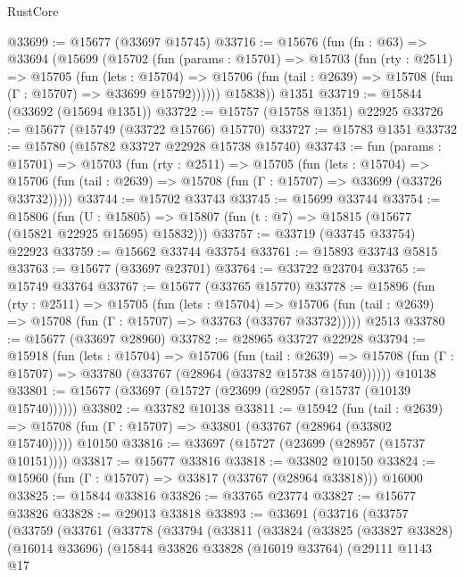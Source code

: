 \begin{lexlean}{RustCore}
\begin{coremodule}
@33699 := @15677 (@33697 @15745)
@33716 := @15676
    (fun (fn : @63) =>
    @33694
      (@15699
        (@15702
          (fun (params : @15701) =>
          @15703
            (fun (rty : @2511) =>
            @15705
              (fun (lets : @15704) =>
              @15706 (fun (tail : @2639) => @15708 (fun (Γ : @15707) => @33699 @15792))))))
        @15838))
    @1351
@33719 := @15844 (@33692 (@15694 @1351))
@33722 := @15757 (@15758 @1351) @22925
@33726 := @15677 (@15749 (@33722 @15766) @15770)
@33727 := @15783 @1351
@33732 := @15780 (@15782 @33727 @22928 @15738 @15740)
@33743 := fun (params : @15701) =>
  @15703
    (fun (rty : @2511) =>
    @15705
      (fun (lets : @15704) =>
      @15706 (fun (tail : @2639) => @15708 (fun (Γ : @15707) => @33699 (@33726 @33732)))))
@33744 := @15702 @33743
@33745 := @15699 @33744
@33754 := @15806
    (fun (U : @15805) => @15807 (fun (t : @7) => @15815 (@15677 (@15821 @22925 @15695) @15832)))
@33757 := @33719 (@33745 @33754) @22923
@33759 := @15662 @33744 @33754
@33761 := @15893 @33743 @5815
@33763 := @15677 (@33697 @23701)
@33764 := @33722 @23704
@33765 := @15749 @33764
@33767 := @15677 (@33765 @15770)
@33778 := @15896
    (fun (rty : @2511) =>
    @15705
      (fun (lets : @15704) =>
      @15706 (fun (tail : @2639) => @15708 (fun (Γ : @15707) => @33763 (@33767 @33732)))))
    @2513
@33780 := @15677 (@33697 @28960)
@33782 := @28965 @33727 @22928
@33794 := @15918
    (fun (lets : @15704) =>
    @15706
      (fun (tail : @2639) =>
      @15708 (fun (Γ : @15707) => @33780 (@33767 (@28964 (@33782 @15738 @15740))))))
    @10138
@33801 := @15677 (@33697 (@15727 (@23699 (@28957 (@15737 (@10139 @15740))))))
@33802 := @33782 @10138
@33811 := @15942
    (fun (tail : @2639) => @15708 (fun (Γ : @15707) => @33801 (@33767 (@28964 (@33802 @15740)))))
    @10150
@33816 := @33697 (@15727 (@23699 (@28957 (@15737 @10151))))
@33817 := @15677 @33816
@33818 := @33802 @10150
@33824 := @15960 (fun (Γ : @15707) => @33817 (@33767 (@28964 @33818))) @16000
@33825 := @15844 @33816
@33826 := @33765 @23774
@33827 := @15677 @33826
@33828 := @29013 @33818
@33893 := @33691
    (@33716
      (@33757
        (@33759
          (@33761
            (@33778
              (@33794
                (@33811
                  (@33824
                    (@33825
                      (@33827 @33828)
                      (@16014 @33696)
                      (@15844
                        @33826
                        @33828
                        (@16019 @33764)
                        (@29111
                          @1143
                          @17

\end{coremodule}
\end{lexlean}
